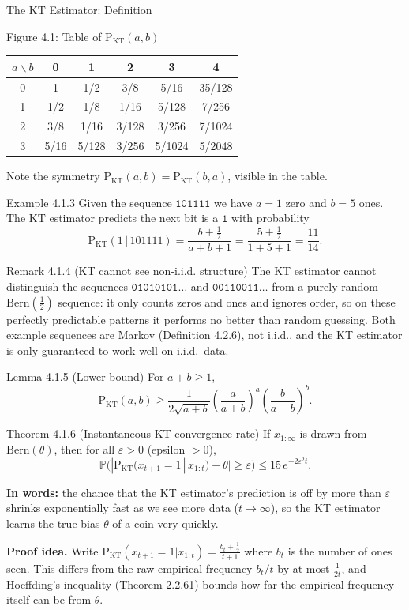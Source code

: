 \documentclass[aspectratio=169,10pt]{beamer}
\newcommand{\PKT}{\mathrm{P}_{\mathrm{KT}}}
\newcommand{\Bern}{\mathrm{Bern}}
\newcommand{\PP}{\mathbb{P}}
\begin{document}
\begin{frame}[allowframebreaks]{The KT Estimator: Definition}
\begin{block}{Figure 4.1: Table of $\PKT(a,b)$}
\centering
\begin{tabular}{c|ccccc}
$a\backslash b$ & 0 & 1 & 2 & 3 & 4 \\ \hline
0 & 1 & 1/2 & 3/8 & 5/16 & 35/128 \\
1 & 1/2 & 1/8 & 1/16 & 5/128 & 7/256 \\
2 & 3/8 & 1/16 & 3/128 & 3/256 & 7/1024 \\
3 & 5/16 & 5/128 & 3/256 & 5/1024 & 5/2048 \\
\end{tabular}
\end{block}
Note the symmetry $\PKT(a,b)=\PKT(b,a)$, visible in the table.

\begin{exampleblock}{Example 4.1.3}
Given the sequence $\mathtt{101111}$ we have $a=1$ zero and $b=5$ ones. The KT estimator
predicts the next bit is a $\mathtt{1}$ with probability
$$
\PKT(1\,|\,101111) = \frac{b+\tfrac12}{a+b+1} = \frac{5+\tfrac12}{1+5+1} = \frac{11}{14}.
$$
\end{exampleblock}

\framebreak

\begin{alertblock}{Remark 4.1.4 (KT cannot see non-i.i.d. structure)}
The KT estimator cannot distinguish the sequences $\mathtt{01010101\ldots}$ and
$\mathtt{00110011\ldots}$ from a purely random $\Bern(\tfrac12)$ sequence: it only counts
zeros and ones and ignores order, so on these perfectly predictable patterns it performs no
better than random guessing. Both example sequences are Markov (Definition 4.2.6), not
i.i.d., and the KT estimator is only guaranteed to work well on i.i.d.\ data.
\end{alertblock}

\begin{block}{Lemma 4.1.5 (Lower bound)}
For $a+b\ge 1$,
$$
\PKT(a,b) \ge \frac{1}{2\sqrt{a+b}}\left(\frac{a}{a+b}\right)^a\left(\frac{b}{a+b}\right)^b.
$$
\end{block}

\framebreak

\begin{block}{Theorem 4.1.6 (Instantaneous KT-convergence rate)}
If $x_{1:\infty}$ is drawn from $\Bern(\theta)$, then for all $\varepsilon>0$ (epsilon $>0$),
$$
\PP\big(|\PKT(x_{t+1}=1\,|\,x_{1:t}) - \theta| \ge \varepsilon\big) \le 15\,e^{-2\varepsilon^2 t}.
$$
\end{block}
\textbf{In words:} the chance that the KT estimator's prediction is off by more than
$\varepsilon$ shrinks exponentially fast as we see more data ($t\to\infty$), so the KT
estimator learns the true bias $\theta$ of a coin very quickly.

\textbf{Proof idea.} Write $\PKT(x_{t+1}=1|x_{1:t}) = \frac{b_t+\frac12}{t+1}$ where $b_t$
is the number of ones seen. This differs from the raw empirical frequency $b_t/t$ by at
most $\frac{1}{2t}$, and Hoeffding's inequality (Theorem 2.2.61) bounds how far the
empirical frequency itself can be from $\theta$.
\end{frame}
\end{document}
